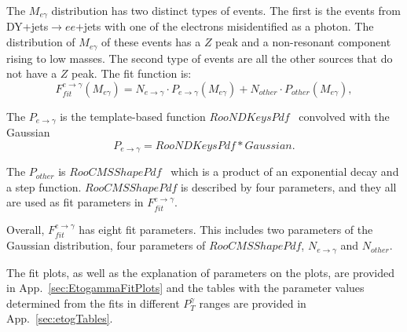 The $M_{e\gamma}$ distribution has two distinct types of events. The first is the events from DY+jets$\rightarrow ee$+jets with one of the electrons misidentified as a photon. The distribution of $M_{e\gamma}$ of these events has a $Z$ peak and a non-resonant component rising to low masses. The second type of events are all the other sources that do not have a $Z$ peak. The fit function is:
\begin{equation}\label{eq:fit_function_etog}
F_{fit}^{e\rightarrow\gamma}(M_{e\gamma}) = N_{e\rightarrow\gamma} \cdot P_{e\rightarrow\gamma}(M_{e\gamma}) +  N_{other} \cdot P_{other}(M_{e\gamma}),
\end{equation}

The $P_{e\rightarrow\gamma}$ is the template-based function $RooNDKeysPdf$~\cite{ref_RooFit} convolved with the Gaussian
\begin{equation}\label{eq:fit_function_etog_1}
 P_{e\rightarrow\gamma} = RooNDKeysPdf \ast Gaussian.
\end{equation}

The $P_{other}$ is $RooCMSShapePdf$~\cite{ref_RooCMSShapePdf} which is a product of an exponential decay and a step function. $RooCMSShapePdf$ is described by four parameters, and they all are used as fit parameters in $F_{fit}^{e\rightarrow\gamma}$. 

Overall,  $F_{fit}^{e\rightarrow\gamma}$ has eight fit parameters. This includes two parameters of the Gaussian distribution, four parameters of $RooCMSShapePdf$, $N_{e\rightarrow\gamma}$ and $N_{other}$.

The fit plots, as well as the explanation of parameters on the plots, are provided in App.~\ref{sec:EtogammaFitPlots} and the tables with the parameter values determined from the fits in different $P_T^{\gamma}$ ranges are provided in App.~\ref{sec:etogTables}.


